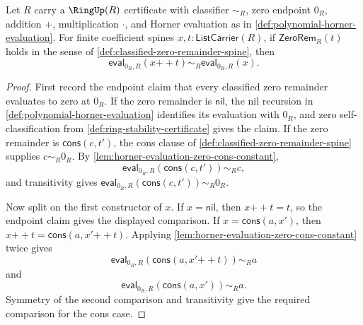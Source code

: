 \begin{lemma}
\label{lem:horner-evaluation-zero-tail-invariance-at-zero}
Let $R$ carry a $\RingUp(R)$ certificate with classifier $\sim_R$, zero endpoint $0_R$, addition $+$, multiplication $\cdot$, and Horner evaluation as in \autoref{def:polynomial-horner-evaluation}. For finite coefficient spines $x,t:\mathsf{ListCarrier}(R)$, if $\mathsf{ZeroRem}_R(t)$ holds in the sense of \autoref{def:classified-zero-remainder-spine}, then
$$
\mathsf{eval}_{0_R,R}(x{++}t)\sim_R\mathsf{eval}_{0_R,R}(x).
$$
\end{lemma}
\begin{proof}
First record the endpoint claim that every classified zero remainder evaluates to zero at $0_R$. If the zero remainder is $\mathsf{nil}$, the nil recursion in \autoref{def:polynomial-horner-evaluation} identifies its evaluation with $0_R$, and zero self-classification from \autoref{def:ring-stability-certificate} gives the claim. If the zero remainder is $\mathsf{cons}(c,t')$, the cons clause of \autoref{def:classified-zero-remainder-spine} supplies $c\sim_R0_R$. By \autoref{lem:horner-evaluation-zero-cons-constant},
$$
\mathsf{eval}_{0_R,R}(\mathsf{cons}(c,t'))\sim_Rc,
$$
and transitivity gives $\mathsf{eval}_{0_R,R}(\mathsf{cons}(c,t'))\sim_R0_R$.

Now split on the first constructor of $x$. If $x=\mathsf{nil}$, then $x{++}t=t$, so the endpoint claim gives the displayed comparison. If $x=\mathsf{cons}(a,x')$, then $x{++}t=\mathsf{cons}(a,x'{++}t)$. Applying \autoref{lem:horner-evaluation-zero-cons-constant} twice gives
$$
\mathsf{eval}_{0_R,R}(\mathsf{cons}(a,x'{++}t))\sim_Ra
$$
and
$$
\mathsf{eval}_{0_R,R}(\mathsf{cons}(a,x'))\sim_Ra.
$$
Symmetry of the second comparison and transitivity give the required comparison for the cons case.
\end{proof}

